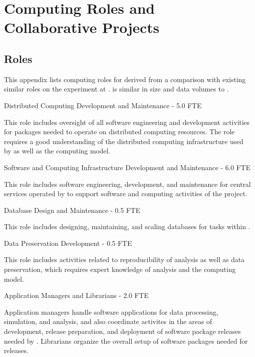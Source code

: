 

\chapter{Computing Roles and Collaborative  Projects} 
\label{appx:es-comp}

\section{Roles}
\label{appx:comp-roles}

This appendix lists computing roles for   derived from a comparison with existing similar roles on the  experiment at .   is similar in size and data volumes to . 

\begin{description}


\item {Distributed Computing Development and Maintenance - 5.0 FTE}

This role includes oversight of all software engineering and development activities for packages needed to operate on distributed computing resources. The role requires a good understanding of the distributed computing infrastructure used by  as well as the  computing model.

\item {Software and Computing Infrastructure Development and Maintenance - 6.0 FTE}

This %
role includes software engineering, development, and maintenance for central services operated by  to support software and computing activities of the project.   %

\item {Database Design and Maintenance - 0.5 FTE}

This role includes designing, maintaining, and scaling databases for  
tasks within . 

\item {Data Preservation Development - 0.5 FTE}

This role includes activities related to reproducibility of analysis as well as data preservation, which requires expert knowledge of analysis and the computing model.

\item {Application Managers and Librarians - 2.0 FTE}

Application managers handle software applications for data processing, simulation, and analysis, and also coordinate activites in the areas of development, release preparation, and %
deployment of software package releases needed by . Librarians organize the overall setup of software packages needed for releases. 


\end{description}
